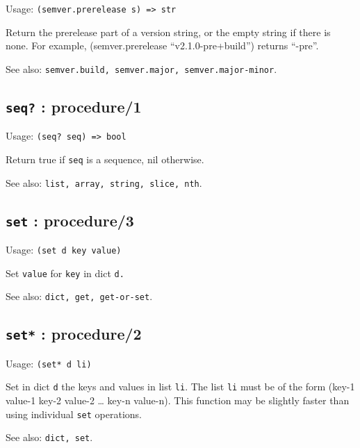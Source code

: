\documentclass[
]{article}
\newcommand{\passthrough}[1]{#1}
\begin{document}
Usage: \passthrough{\lstinline!(semver.prerelease s) => str!}

Return the prerelease part of a version string, or the empty string if
there is none. For example, (semver.prerelease ``v2.1.0-pre+build'')
returns ``-pre''.

See also:
\passthrough{\lstinline!semver.build, semver.major, semver.major-minor!}.

\hypertarget{seq-procedure1-1}{%
\subsection{\texorpdfstring{\texttt{seq?} :
procedure/1}{seq? : procedure/1}}\label{seq-procedure1-1}}

Usage: \passthrough{\lstinline!(seq? seq) => bool!}

Return true if \passthrough{\lstinline!seq!} is a sequence, nil
otherwise.

See also: \passthrough{\lstinline!list, array, string, slice, nth!}.

\hypertarget{set-procedure3-1}{%
\subsection{\texorpdfstring{\texttt{set} :
procedure/3}{set : procedure/3}}\label{set-procedure3-1}}

Usage: \passthrough{\lstinline!(set d key value)!}

Set \passthrough{\lstinline!value!} for \passthrough{\lstinline!key!} in
dict \passthrough{\lstinline!d.!}

See also: \passthrough{\lstinline!dict, get, get-or-set!}.

\hypertarget{set-procedure2-1}{%
\subsection{\texorpdfstring{\texttt{set*} :
procedure/2}{set* : procedure/2}}\label{set-procedure2-1}}

Usage: \passthrough{\lstinline!(set* d li)!}

Set in dict \passthrough{\lstinline!d!} the keys and values in list
\passthrough{\lstinline!li!}. The list \passthrough{\lstinline!li!} must
be of the form (key-1 value-1 key-2 value-2 \ldots{} key-n value-n).
This function may be slightly faster than using individual
\passthrough{\lstinline!set!} operations.

See also: \passthrough{\lstinline!dict, set!}.
\end{document}
